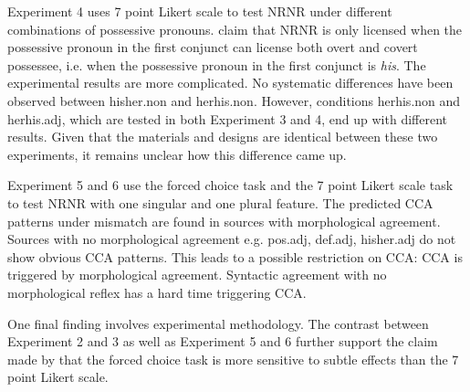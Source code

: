 \documentclass[
  11pt          %
  ,letterpaper  %
  ,center       %
  ,noupper      %
  ]{uconnthesis2}
\begin{document}
Experiment 4 uses 7 point Likert scale to test NRNR under different combinations of possessive pronouns. \cite{Shen:ip2} claim that NRNR is only licensed when the possessive pronoun in the first conjunct can license both overt and covert possessee, i.e. when the possessive pronoun in the first conjunct is \textit{his}. The experimental results are more complicated. No systematic differences have been observed between hisher.non and herhis.non. However, conditions herhis.non and herhis.adj, which are tested in both Experiment 3 and 4, end up with different results. Given that the materials and designs are identical between these two experiments, it remains unclear how this difference came up.

Experiment 5 and 6 use the forced choice task and the 7 point Likert scale task to test NRNR with one singular and one plural feature. The predicted CCA patterns under mismatch are found in sources with morphological agreement. Sources with no morphological agreement e.g. pos.adj, def.adj, hisher.adj do not show obvious CCA patterns. This leads to a possible restriction on CCA: CCA is triggered by morphological agreement. Syntactic agreement with no morphological reflex has a hard time triggering CCA.

One final finding involves experimental methodology. The contrast between Experiment 2 and 3 as well as Experiment 5 and 6 further support the claim made by \cite{Sprouse:2013} that the forced choice task is more sensitive to subtle effects than the 7 point Likert scale.



\end{document}
